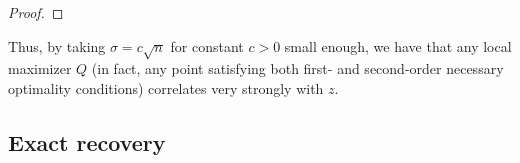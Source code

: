 \documentclass{colt2016} %
\newcommand{\inner}[2]{\left\langle{#1},{#2}\right\rangle}
\newcommand{\trace}{\mathrm{Tr}}
\newcommand{\1}{\mathbf{1}}
\newcommand{\TODO}[1]{{\color{red}{[#1]}}}
\begin{document}
\begin{proof}
\end{proof}
Thus, by taking $\sigma = c\sqrt{n}$ for constant $c > 0$ small enough, we have that any local maximizer $Q$ (in fact, any point satisfying both first- and second-order necessary optimality conditions) correlates very strongly with $z$.



\subsection{Exact recovery}
\end{document}
